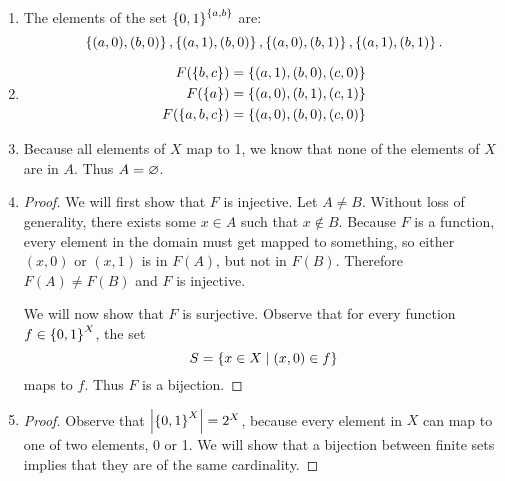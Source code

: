 \documentclass[class=article, crop=false]{standalone}
\begin{document}
  \begin{enumerate}[label=(\alph*)]
    \item The elements of the set $\left\{0, 1\right\}^{\left\{a, b\right\}}$ are:
    \[
      \left\{(a,0),(b,0)\right\}, \left\{(a,1),(b,0)\right\}, \left\{(a,0),(b,1)\right\}, \left\{(a,1),(b,1)\right\}.
    \]
    \item
    \begin{align*}
      F(\left\{b, c\right\}) &= \left\{(a, 1), (b, 0), (c, 0)\right\} \\
      F(\left\{a\right\}) &= \left\{(a, 0), (b, 1), (c, 1)\right\} \\
      F(\left\{a, b, c\right\}) &= \left\{(a, 0), (b, 0), (c, 0)\right\}
    \end{align*}
    \item Because all elements of $X$ map to 1, we know that none of the elements of $X$ are in $A$. Thus $A = \varnothing$.
    \item
    \begin{proof}
      We will first show that $F$ is injective. Let $A \neq B$. Without loss of generality, there exists some $x\in A$ such that $x \notin B$. Because $F$ is a function, every element in the domain must get mapped to something, so either $(x, 0)$ or $(x, 1)$ is in $F(A)$, but not in $F(B)$. Therefore $F(A) \neq F(B)$ and $F$ is injective. \par
      We will now show that $F$ is surjective. Observe that for every function $f\in \left\{0, 1\right\}^{X}$, the set
      \[
        S = \left\{x\in X\mid (x, 0)\in f\right\}
      \]
      maps to $f$. Thus $F$ is a bijection.
    \end{proof}
    \item
    \begin{proof}
      Observe that $\left\lvert \left\{0, 1\right\}^X \right\rvert = 2^X$, because every element in $X$ can map to one of two elements, 0 or 1. We will show that a bijection between finite sets implies that they are of the same cardinality. 
    \end{proof}
  \end{enumerate}
\end{document}
